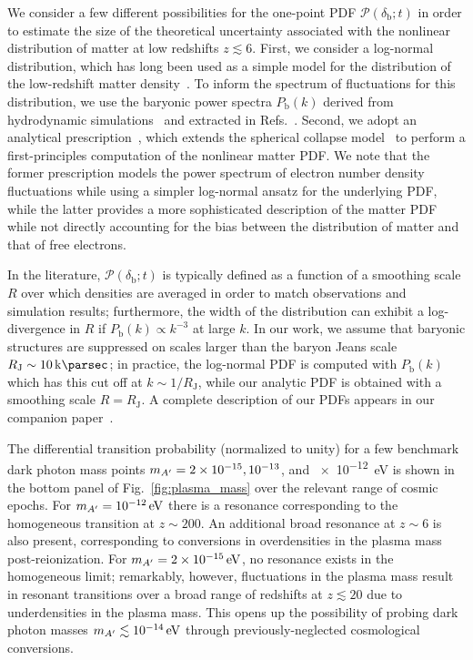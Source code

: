 \documentclass[prd,aps,10pt,nofootinbib,twocolumn,superscriptaddress,preprintnumbers,balancelastpage,longbibliography]{revtex4-1}
\begin{document}
We consider a few different possibilities for the one-point PDF $\mathcal{P}(\delta_\mathrm{b}; t)$ in order to estimate the size of the theoretical uncertainty associated with the nonlinear distribution of matter at low redshifts $z \lesssim 6$. First, we consider a log-normal distribution, which has long been used as a simple model for the distribution of the low-redshift matter density~\cite{1934ApJ....79....8H, Coles:1991if, Kayo:2001gu, Wild:2004me}. To inform the spectrum of fluctuations for this distribution, we use the baryonic power spectra $P_\mathrm{b}(k)$ derived from hydrodynamic simulations~\cite{Nelson:2018uso,McAlpine:2015tma,McCarthy:2016mry,Genel:2014lma} and extracted in Refs.~\cite{Foreman:2019ahr,vanDaalen:2019pst}.
Second, we adopt an analytical prescription~\cite{Ivanov:2018lcg}, which extends the spherical collapse model~\cite{Valageas:2001zr, Valageas:2001td} to 
perform a first-principles computation of the nonlinear matter PDF\@. We note that the former prescription models the power spectrum of electron number density fluctuations while using a simpler log-normal ansatz for the underlying PDF, while the latter provides a more sophisticated description of the matter PDF while not directly accounting for the bias between the distribution of matter and that of free electrons. 

In the literature, $\mathcal{P}(\delta_\mathrm{b};t)$ is typically defined as a function of a smoothing scale $R$ over which densities are averaged in order to match observations and simulation results; furthermore, the width of the distribution can exhibit a log-divergence in $R$ if $P_\mathrm{b}(k) \propto k^{-3}$ at large $k$. In our work, we assume that baryonic structures are suppressed on scales larger than the baryon Jeans scale $R_\mathrm{J} \sim \SI{10}{\kilo\parsec}$; in practice, the log-normal PDF is computed with $P_\mathrm{b}(k)$ which has this cut off at $k \sim 1/R_\mathrm{J}$, while our analytic PDF is obtained with a smoothing scale $R = R_\mathrm{J}$. A complete description of our PDFs appears in our companion paper~\cite{OurLongPaper}.

The differential transition probability (normalized to unity) for a few benchmark dark photon mass points $m_{A^\prime}=\SI{2e-15}{}, \SI{e-13}{}$, and \SI{e-12}{\eV} is shown in the bottom panel of Fig.~\ref{fig:plasma_mass} over the relevant range of cosmic epochs. For $\mAp = \SI{e-12}{\eV}$ there is a resonance corresponding to the homogeneous transition at $z\sim 200$.  An additional broad resonance at $z\sim 6$ is also present, corresponding to conversions in overdensities in the plasma mass post-reionization. For $\mAp = \SI{2e-15}{\eV}$, no resonance exists in the homogeneous limit; remarkably, however, fluctuations in the plasma mass result in resonant transitions over a broad range of redshifts at $z\lesssim20$ due to underdensities in the plasma mass.
This opens up the possibility of probing dark photon masses $\mAp \lesssim \SI{e-14}{\eV}$ through previously-neglected cosmological conversions. 
\end{document}
